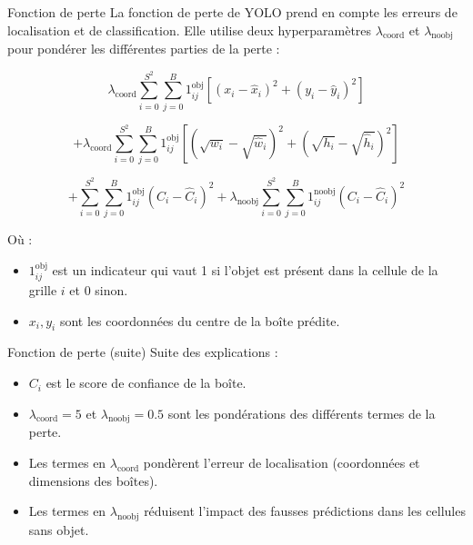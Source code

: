 \documentclass{beamer}
\begin{document}
\begin{frame}{Fonction de perte}
    La fonction de perte de YOLO prend en compte les erreurs de localisation et de classification. 
    Elle utilise deux hyperparamètres $\lambda_{\text{coord}}$ et $\lambda_{\text{noobj}}$ pour pondérer les différentes parties de la perte :
    
    \begin{equation}
    \lambda_{\text{coord}} \sum_{i=0}^{S^2} \sum_{j=0}^{B} 1^{\text{obj}}_{ij} \left[(x_i - \hat{x}_i)^2 + (y_i - \hat{y}_i)^2\right]
    \end{equation}

    \begin{equation}
    + \lambda_{\text{coord}} \sum_{i=0}^{S^2} \sum_{j=0}^{B} 1^{\text{obj}}_{ij} \left[\left(\sqrt{w_i} - \sqrt{\hat{w}_i}\right)^2 + \left(\sqrt{h_i} - \sqrt{\hat{h}_i}\right)^2 \right]
    \end{equation}
    
    \begin{equation}
    + \sum_{i=0}^{S^2} \sum_{j=0}^{B} 1^{\text{obj}}_{ij} \left(C_i - \hat{C}_i\right)^2 + \lambda_{\text{noobj}} \sum_{i=0}^{S^2} \sum_{j=0}^{B} 1^{\text{noobj}}_{ij} \left(C_i - \hat{C}_i\right)^2
    \end{equation}
    
    Où :
    \begin{itemize}
        \item $1^{\text{obj}}_{ij}$ est un indicateur qui vaut 1 si l'objet est présent dans la cellule de la grille $i$ et 0 sinon.
        \item $x_i, y_i$ sont les coordonnées du centre de la boîte prédite.
    \end{itemize}
\end{frame}

\begin{frame}{Fonction de perte (suite)}
    Suite des explications :
    \begin{itemize}
        \item $C_i$ est le score de confiance de la boîte.
        \item $\lambda_{\text{coord}} = 5$ et $\lambda_{\text{noobj}} = 0.5$ sont les pondérations des différents termes de la perte.
        \item Les termes en $\lambda_{\text{coord}}$ pondèrent l'erreur de localisation (coordonnées et dimensions des boîtes).
        \item Les termes en $\lambda_{\text{noobj}}$ réduisent l'impact des fausses prédictions dans les cellules sans objet.
    \end{itemize}
\end{frame}
\end{document}
